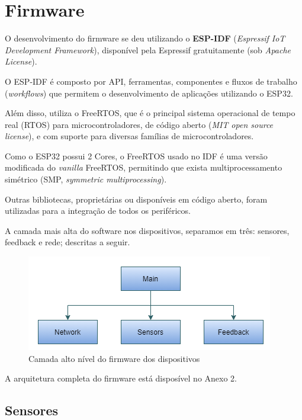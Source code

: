 \documentclass[../monografia.tex]{subfiles}
\begin{document}
\section{Firmware} \label{firmware}

O desenvolvimento do firmware se deu utilizando o \textbf{ESP-IDF} (\textit{Espressif IoT Development Framework}), disponível pela Espressif\cite{esp-idf} gratuitamente (sob \textit{Apache License}). 

O ESP-IDF é composto por API, ferramentas, componentes e fluxos de trabalho (\textit{workflows}) que permitem o desenvolvimento de aplicações utilizando o ESP32. 

Além disso, utiliza o FreeRTOS, que é o principal sistema operacional de tempo real (RTOS) para microcontroladores\cite{freertos}, de código aberto (\textit{MIT open source license}), e com suporte para diversas famílias de microcontroladores.

Como o ESP32 possui 2 Cores, o FreeRTOS usado no IDF é uma versão modificada do \textit{vanilla} FreeRTOS, permitindo que exista multiprocessamento simétrico (SMP, \textit{symmetric multiprocessing}).

Outras bibliotecas, proprietárias ou disponíveis em código aberto, foram utilizadas para a integração de todos os periféricos. 

A camada mais alta do software nos dispositivos, separamos em três: sensores, feedback e rede; descritas a seguir. %

\begin{figure}[h!]
	\centering
	\includegraphics[scale=0.8]{fw-arch-1}
	\caption{Camada alto nível do firmware dos dispositivos}
	\label{fig:fw-arch}
\end{figure}

A arquitetura completa do firmware está disposível no Anexo 2. %

\subsection{Sensores} %
\end{document}
